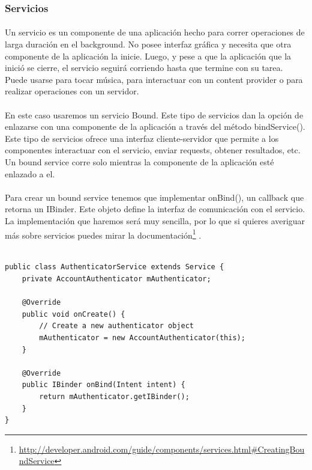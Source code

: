 \documentclass[10pt]{extarticle}
\begin{document}
\subsubsection{Servicios}

\paragraph{}
Un servicio es un componente de una aplicación hecho para correr operaciones de larga duración en el background. No posee interfaz gráfica y necesita que otra componente de la aplicación la inicie. Luego, y pese a que la aplicación que la inició se cierre, el servicio seguirá corriendo hasta que termine con su tarea. Puede usarse para tocar música, para interactuar con un content provider o para realizar operaciones con un servidor.

\paragraph{}
En este caso usaremos un servicio Bound. Este tipo de servicios dan la opción de enlazarse con una componente de la aplicación a través del método bindService(). Este tipo de servicios ofrece una interfaz cliente-servidor que permite a los componentes interactuar con el servicio, enviar requests, obtener resultados, etc. Un bound service corre solo mientras la componente de la aplicación esté enlazado a el.

\paragraph{}
Para crear un bound service tenemos que implementar onBind(), un callback que retorna un IBinder. Este objeto define la interfaz de comunicación con el servicio. La implementación que haremos será muy sencilla, por lo que si quieres averiguar más sobre servicios puedes mirar la documentación\footnote{\url{http://developer.android.com/guide/components/services.html\#CreatingBoundService}}
.

\begin{lstlisting}

public class AuthenticatorService extends Service {
    private AccountAuthenticator mAuthenticator;
    
    @Override
    public void onCreate() {
        // Create a new authenticator object
        mAuthenticator = new AccountAuthenticator(this);
    }

    @Override
    public IBinder onBind(Intent intent) {
        return mAuthenticator.getIBinder();
    }
}

\end{lstlisting}
\end{document}

